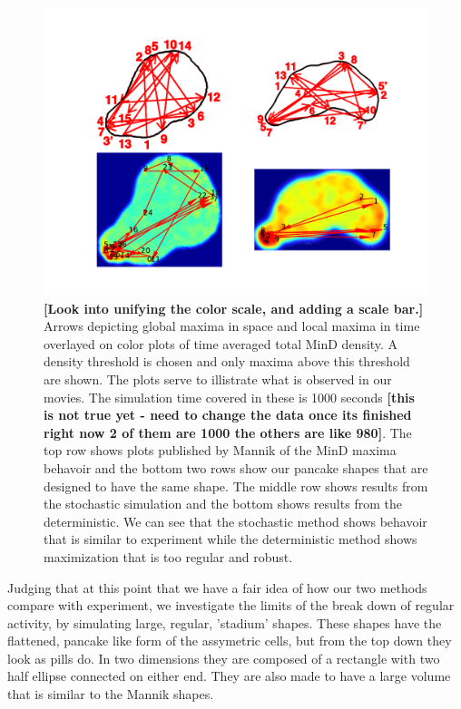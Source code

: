 \documentclass[letterpaper,twocolumn,amsmath,amssymb,pre]{revtex4-1}
\newcommand{\red}[1]{{\bf \color{red} #1}}
\newcommand{\fixme}[1]{\red{[#1]}}
\begin{document}
\begin{figure}
  \centering
  \includegraphics[width=\textwidth]{../paper/plot-ave}
  \caption{\fixme{Look into unifying the color scale, and adding a
      scale bar.} Arrows depicting global maxima in space and local
    maxima in
    time overlayed on color plots of time averaged total MinD density.
    A density threshold is chosen and only maxima above this threshold
    are shown. The plots serve to illistrate what is observed in our
    movies.  The simulation time covered in these is 1000 seconds
    \fixme{this is not true yet - need to change the data once its
      finished right now 2 of them are 1000 the others are like 980}.
    The top row shows plots published by Mannik of the MinD maxima
    behavoir and the bottom two rows show our pancake shapes that are
    designed to have the same shape.  The middle row shows results
    from the stochastic simulation and the bottom shows results from
    the deterministic.  We can see that the stochastic method shows
    behavoir that is similar to experiment while the deterministic
    method shows maximization that is too regular and robust.}
  \label{randst-plot-ave}
\end{figure}

Judging that at this point that we have a fair idea of how our two
methods compare with experiment, we investigate the limits of the
break down of regular activity, by simulating large, regular,
'stadium' shapes.  These shapes have the flattened, pancake like form
of the assymetric cells, but from the top down they look as pills
do. In two dimensions they are composed of a rectangle with two half
ellipse connected on either end.  They are also made to have a large
volume that is similar to the Mannik shapes.
\end{document}
